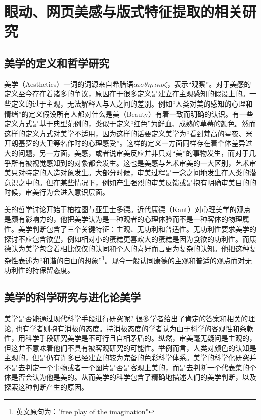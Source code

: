 \chapter{眼动、网页美感与版式特征提取的相关研究}
\label{chap:related}

\section{美学的定义和哲学研究}
美学（Aesthetics）一词的词源来自希腊语$\alpha\iota\sigma\theta\eta\tau\iota{\kappa}o\zeta$，表示“观察”。对于美感的定义至今存在着诸多的争议，原因在于很多定义是建立在主观感知的假设上的。一些定义的过于主观，无法解释人与人之间的差别。例如“人类对美的感知的心理和情绪”的定义假设所有人都对什么是美（Beauty）有着一致而明确的认识。有一些定义方式是基于典型范例的，类似于定义“红色”为鲜血、成熟的草莓的颜色。然而这样的定义方式对美学不适用，因为这样的话要定义美学为“看到梵高的星夜、米开朗基罗的大卫等名作时的心理感受”。这样的定义一方面同样存在着个体差异过大的问题，另一方面，美感，或者说审美反应并非只对“美”的事物发生，而对于几乎所有被视觉感知到的对象都会发生。这也是美感与艺术审美的一大区别，艺术审美只对特定的人造对象发生。大部分时候，审美过程是一念之间地发生在人类的潜意识之中的。但在某些情况下，例如产生强烈的审美反馈或是抱有明确审美目的的时候，审美行为会进入意识层面。

美的哲学讨论开始于柏拉图与亚里士多德。近代康德（Kant）对心理美学的观点是颇有影响力的，他把美学认为是一种观者的心理体验而不是一种客体的物理属性。美学判断包含了三个关键特征：主观、无功利和普适性。无功利性要求美学的探讨不应包含欲望，例如相对小的蛋糕更喜欢大的蛋糕是因为食欲的功利性。而康德认为美学包含着相比仅仅的认同和个人的喜好而言更为复杂的认知。他把这种复杂性表述为“和谐的自由的想象”\footnote{英文原句为："free play of the imagination"}。现今一般认同康德的主观和普适的观点而对无功利性的持保留态度。

\section{美学的科学研究与进化论美学}
美学是否能通过现代科学手段进行研究呢? 很多学者给出了肯定的答案和相关的理论, 也有学者则抱有消极的态度。持消极态度的学者认为由于科学的客观性和条款性，用科学手段研究美学是不可行且自相矛盾的。纵然，审美毫无疑问是主观的，但这并不意味着他们不具有被客观研究的可能性。举例而言，人类对颜色的认知是主观的，但是仍有许多已经建立的较为完备的色彩科学体系。美学的科学化研究并不是去判定一个事物或者一个图片是否是客观上美的，而是去判断一个代表集的个体是否会认为他是美的。从而美学的科学包含了精确地描述人们的美学判断，以及探索这种判断产生的原因。


